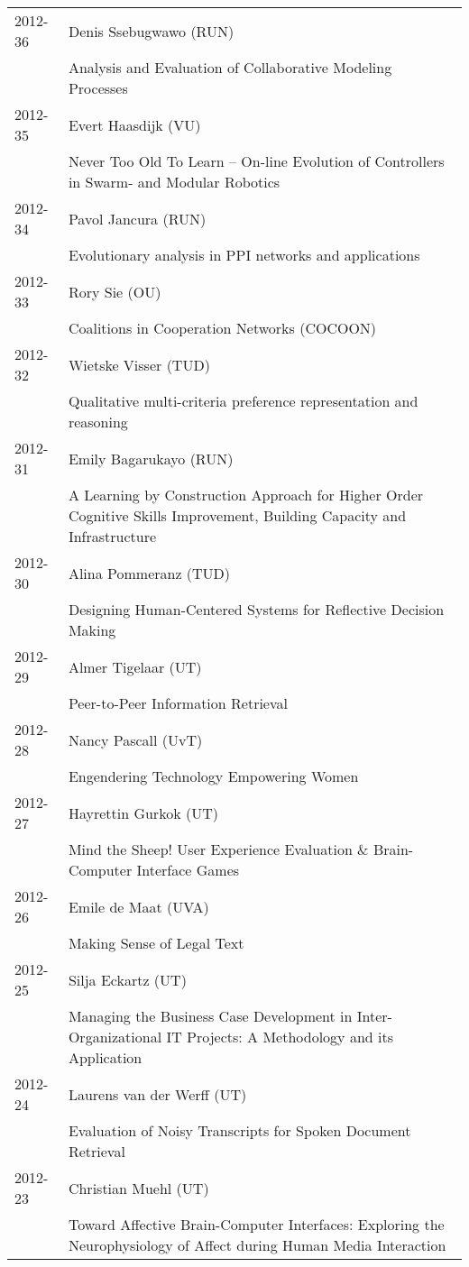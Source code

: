 \begin{longtable}{p{1.25cm}p{10.75cm}}
2012-36 & Denis Ssebugwawo (RUN) \\& Analysis and Evaluation of Collaborative Modeling Processes \\
2012-35 & Evert Haasdijk (VU) \\& Never Too Old To Learn -- On-line Evolution of Controllers in Swarm- and Modular Robotics \\
2012-34 & Pavol Jancura (RUN) \\& Evolutionary analysis in PPI networks and applications \\
2012-33 & Rory Sie (OU) \\& Coalitions in Cooperation Networks (COCOON) \\
2012-32 & Wietske Visser (TUD) \\& Qualitative multi-criteria preference representation and reasoning \\
2012-31 & Emily Bagarukayo (RUN) \\& A Learning by Construction Approach for Higher Order Cognitive Skills Improvement, Building Capacity and Infrastructure \\
2012-30 & Alina Pommeranz (TUD) \\& Designing Human-Centered Systems for Reflective Decision Making \\
2012-29 & Almer Tigelaar (UT) \\& Peer-to-Peer Information Retrieval \\
2012-28 & Nancy Pascall (UvT) \\& Engendering Technology Empowering Women \\
2012-27 & Hayrettin Gurkok (UT) \\& Mind the Sheep! User Experience Evaluation \& Brain-Computer Interface Games \\
2012-26 & Emile de Maat (UVA) \\& Making Sense of Legal Text \\
2012-25 & Silja Eckartz (UT) \\& Managing the Business Case Development in Inter-Organizational IT \newline Projects: A Methodology and its Application \\
2012-24 & Laurens van der Werff (UT) \\& Evaluation of Noisy Transcripts for Spoken Document Retrieval \\
2012-23 & Christian Muehl (UT) \\& Toward Affective Brain-Computer Interfaces: Exploring the Neurophysiology of Affect during Human Media Interaction \\

\end{longtable}
